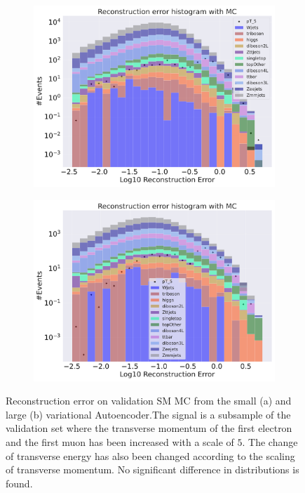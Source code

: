 \begin{figure}[H]
    \centering
    \begin{subfigure}{.45\textwidth}
        \includegraphics[width=\textwidth]{Figures/VAE_testing/small/b_data_recon_big_rm3_feats_sig_pT_5.pdf}
        \caption{}
        \label{fig:VAE_small_pt_5}
    \end{subfigure}
    \hfill 
    \begin{subfigure}{.45\textwidth}
        \includegraphics[width=\textwidth]{Figures/VAE_testing/big/b_data_recon_big_rm3_feats_sig_pT_5.pdf}
        \caption{ }
        \label{fig:VAE_big_pt_5}
    \end{subfigure}
    \hfill 
    \caption[VAE | Reconstruction error $p_T$ altering of 5]{Reconstruction error on validation SM MC from the small (a) and large (b) variational Autoencoder.The signal is a subsample of the validation 
    set where the transverse momentum of the first electron and the first muon has been increased with a scale of $5$. The change of transverse 
    energy has also been changed according to the scaling of transverse momentum.  No significant difference in distributions is found.  }
    \label{fig:VAE_big_small_pt_5}
\end{figure}


